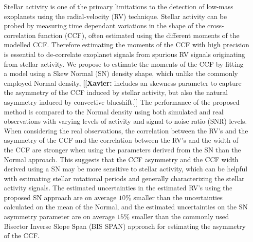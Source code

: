 \documentclass{aa}
\newcommand{\xavier}[1]{{\color{blue}[[\textbf{Xavier: }#1]]}}
\begin{document}
\abstract
{Stellar activity is one of the primary limitations to the detection of low-mass exoplanets using the radial-velocity (RV) technique. 
Stellar activity can be probed by measuring time dependant variations in the shape of the cross-correlation function (CCF), often estimated using the different moments of the modelled CCF. Therefore estimating the moments of the CCF with high precision is essential to de-correlate exoplanet signals from spurious RV signals originating from stellar activity.}
%
{We propose to estimate the moments of the CCF by fitting a model using a Skew Normal (SN) density shape, which unlike the commonly employed Normal density, \xavier{includes an skewness parameter to capture the asymmetry of the CCF induced by stellar activity, but also the natural asymmetry induced by convective blueshift.}}
%
{The performance of the proposed method is compared to the Normal density using both simulated and real observations with varying levels of activity and signal-to-noise ratio (SNR) levels.}
%
{When considering the real observations, the correlation between the RV's and the asymmetry of the CCF and the correlation between the RV's and the width of the CCF are stronger when using the parameters derived from the SN than the Normal approach. 
This suggests that the CCF asymmetry and the CCF width derived using a SN may be more sensitive to stellar activity, which can be helpful with estimating stellar rotational periods and generally characterizing the stellar activity signals.
The estimated uncertainties in the estimated RV's using the proposed SN approach are on average $10\%$ smaller than the uncertainties calculated on the mean of the Normal, and the estimated uncertainties on the SN asymmetry parameter are on average $15\%$ smaller than the commonly used Bisector Inverse Slope Span (BIS SPAN) approach for estimating the asymmetry of the CCF. }
%
\end{document}
